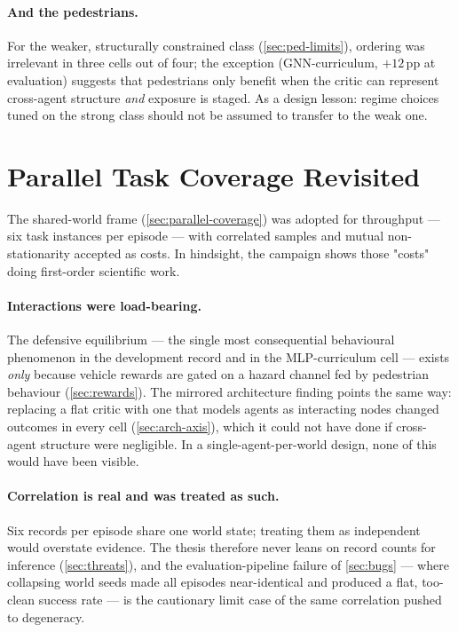 \paragraph{And the pedestrians.}
For the weaker, structurally constrained class
(\cref{sec:ped-limits}), ordering was irrelevant in three cells out of
four; the exception (GNN-curriculum, $+12$\,pp at evaluation) suggests
that pedestrians only benefit when the critic can represent cross-agent
structure \emph{and} exposure is staged. As a design lesson: regime
choices tuned on the strong class should not be assumed to transfer to
the weak one.

\section{Parallel Task Coverage Revisited}
\label{sec:ptc-revisited}

The shared-world frame (\cref{sec:parallel-coverage}) was adopted for
throughput --- six task instances per episode --- with correlated
samples and mutual non-stationarity accepted as costs. In hindsight, the
campaign shows those "costs" doing first-order scientific work.

\paragraph{Interactions were load-bearing.}
The defensive equilibrium --- the single most consequential behavioural
phenomenon in the development record and in the MLP-curriculum cell ---
exists \emph{only} because vehicle rewards are gated on a hazard channel
fed by pedestrian behaviour (\cref{sec:rewards}). The mirrored
architecture finding points the same way: replacing a flat critic with
one that models agents as interacting nodes changed outcomes in every
cell (\cref{sec:arch-axis}), which it could not have done if
cross-agent structure were negligible. In a single-agent-per-world
design, none of this would have been visible.

\paragraph{Correlation is real and was treated as such.}
Six records per episode share one world state; treating them as
independent would overstate evidence. The thesis therefore never leans
on record counts for inference (\cref{sec:threats}), and the
evaluation-pipeline failure of \cref{sec:bugs} --- where collapsing
world seeds made all episodes near-identical and produced a flat,
too-clean success rate --- is the cautionary limit case of the same
correlation pushed to degeneracy.

